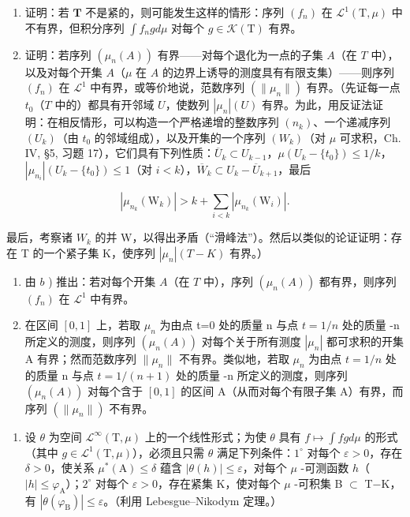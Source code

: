 \begin{enumerate}
\def\labelenumi{\alph{enumi})}
\item
  证明：若 \(\mathbf{T}\) 不是紧的，则可能发生这样的情形：序列 \((f_n)\) 在 \(\mathcal{L}^1 (\mathrm{T},\mu)\) 中不有界，但积分序列 \(\int f_n g d\mu\) 对每个 \(g\in \mathcal{K}(\mathrm{T})\) 有界。
\item
  证明：若序列 \((\mu_n(A))\) 有界——对每个退化为一点的子集 \(A\)（在 \(T\) 中），以及对每个开集 \(A\)（\(\mu\) 在 \(A\) 的边界上诱导的测度具有有限支集）——则序列 \((f_n)\) 在 \(\mathcal{L}^1\) 中有界，或等价地说，范数序列 \((\|\mu_n\|)\) 有界。（先证每一点 \(t_0\)（\(T\) 中的）都具有开邻域 \(U\)，使数列 \(|\mu_n|(U)\) 有界。为此，用反证法证明：在相反情形，可以构造一个严格递增的整数序列 \((n_k)\)、一个递减序列 \((U_k)\)（由 \(t_0\) 的邻域组成），以及开集的一个序列 \((W_k)\)（对 \(\mu\) 可求积，Ch. IV, §5, 习题 17），它们具有下列性质：\(\overline{U}_k \subset U_{k-1}\)，\(\mu(U_k - \{t_0\}) \leqslant 1/k\)，\(|\mu_{n_i}|(U_k - \{t_0\}) \leqslant 1\)（对 \(i < k\)），\(\overline{W}_k \subset U_k - \overline{U}_{k+1}\)，最后
\end{enumerate}

\[
\left| \mu_ {n _ {k}} \left(\mathrm{W} _ {k}\right) \right| > k + \sum_ {i <   k} \left| \mu_ {n _ {k}} \left(\mathrm{W} _ {i}\right) \right|.
\]

最后，考察诸 \(W_{k}\) 的并 W，以得出矛盾（“滑峰法”）。然后以类似的论证证明：存在 T 的一个紧子集 K，使序列 \(|\mu_{n}|(T - K)\) 有界。）

\begin{enumerate}
\def\labelenumi{\alph{enumi})}
\setcounter{enumi}{2}
\item
  由 \(b\) ) 推出：若对每个开集 \(A\)（在 \(T\) 中），序列 \((\mu_n(A))\) 都有界，则序列 \((f_n)\) 在 \(\mathcal{L}^1\) 中有界。
\item
  在区间 \([0,1]\) 上，若取 \(\mu_{n}\) 为由点 t=0 处的质量 n 与点 \(t=1/n\) 处的质量 -n 所定义的测度，则序列 \((\mu_{n}(A))\) 对每个关于所有测度 \(|\mu_{n}|\) 都可求积的开集 A 有界；然而范数序列 \(\|\mu_{n}\|\) 不有界。类似地，若取 \(\mu_{n}\) 为由点 \(t=1/n\) 处的质量 n 与点 \(t=1/(n+1)\) 处的质量 -n 所定义的测度，则序列 \((\mu_{n}(A))\) 对每个含于 \([0,1]\) 的区间 A（从而对每个有限子集 A）有界，而序列 \((\|\mu_{n}\|)\) 不有界。
\end{enumerate}

\begin{enumerate}
\def\labelenumi{\arabic{enumi})}
\setcounter{enumi}{13}
\tightlist
\item
  设 \(\theta\) 为空间 \(\mathcal{L}^{\infty}(\mathrm{T},\mu)\) 上的一个线性形式；为使 \(\theta\) 具有 \(f\mapsto\int fg d\mu\) 的形式（其中 \(g\in\mathcal{L}^{1}(\mathrm{T},\mu)\)），必须且只需 \(\theta\) 满足下列条件：\(1^{\circ}\) 对每个 \(\varepsilon>0\)，存在 \(\delta>0\)，使关系 \(\mu^{*}(\mathrm{A})\leqslant\delta\) 蕴含 \(|\theta(h)|\leqslant\varepsilon\)，对每个 \(\mu\) -可测函数 \(h\)（\(|h|\leqslant\varphi_{\mathrm{A}}\)）；\(2^{\circ}\) 对每个 \(\varepsilon>0\)，存在紧集 K，使对每个 \(\mu\) -可积集 B \(\subset\) T−K，有 \(|\theta(\varphi_{\mathrm{B}})|\leqslant\varepsilon\)。（利用 Lebesgue--Nikodym 定理。）
\end{enumerate}

